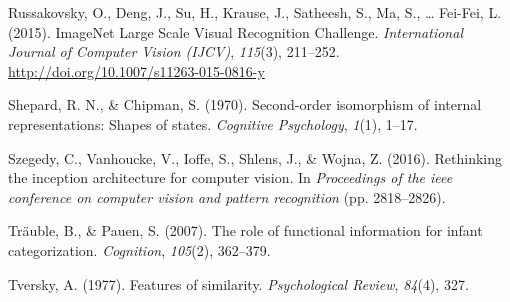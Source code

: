 \documentclass[10pt, letterpaper]{article}
\begin{document}
\hypertarget{ref-ILSVRC15}{}
Russakovsky, O., Deng, J., Su, H., Krause, J., Satheesh, S., Ma, S.,
\ldots{} Fei-Fei, L. (2015). ImageNet Large Scale Visual Recognition
Challenge. \emph{International Journal of Computer Vision (IJCV)},
\emph{115}(3), 211--252. \url{http://doi.org/10.1007/s11263-015-0816-y}

\hypertarget{ref-shepard1970second}{}
Shepard, R. N., \& Chipman, S. (1970). Second-order isomorphism of
internal representations: Shapes of states. \emph{Cognitive Psychology},
\emph{1}(1), 1--17.

\hypertarget{ref-szegedy2016rethinking}{}
Szegedy, C., Vanhoucke, V., Ioffe, S., Shlens, J., \& Wojna, Z. (2016).
Rethinking the inception architecture for computer vision. In
\emph{Proceedings of the ieee conference on computer vision and pattern
recognition} (pp. 2818--2826).

\hypertarget{ref-trauble2007role}{}
Träuble, B., \& Pauen, S. (2007). The role of functional information for
infant categorization. \emph{Cognition}, \emph{105}(2), 362--379.

\hypertarget{ref-tversky1977features}{}
Tversky, A. (1977). Features of similarity. \emph{Psychological Review},
\emph{84}(4), 327.
\end{document}
